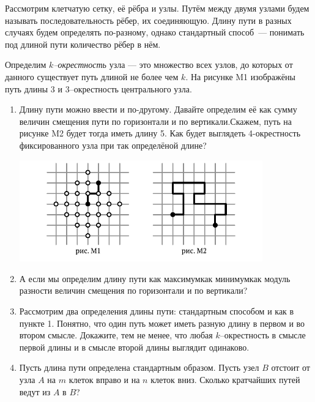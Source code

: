 ﻿

\noindent Рассмотрим клетчатую сетку, её рёбра и узлы. Путём между двумя узлами будем называть последовательность рёбер, их соединяющую. Длину пути в разных случаях будем определять по-разному, однако стандартный способ~— понимать под длиной пути количество рёбер в нём.

\ms Определим {\itshape $k$--окрестность} узла — это множество всех узлов, до которых от данного существует путь длиной не более чем $k$. На рисунке M1 изображёны путь длины 3 и 3--окрестность центрального узла.

\begin{enumerate}

\item Длину пути можно ввести и по-другому. Давайте определим её как сумму величин смещения пути по горизонтали и по вертикали.\linebreak Скажем, путь на рисунке M2 будет тогда иметь длину 5. Как будет выглядеть 4-окрестность фиксированного узла при так определёной длине?

\vspace{-0.3cm}
\begin{center}
\includegraphics[width=10.5cm]{stats/2017/images/metro1.pdf}
\end{center} \vspace{-0.7cm}

\item А если мы определим длину пути как максимум\scolon как минимум\scolon как модуль разности величин смещения по горизонтали и по вертикали?

\item Рассмотрим два определения длины пути: стандартным способом и как в пункте 1. Понятно, что один путь может иметь разную длину в первом и во втором смысле. Докажите, тем не менее, что любая $k$--окрестность в смысле первой длины и в смысле второй длины выглядит одинаково.

\item Пусть длина пути определена стандартным образом. Пусть узел $B$ отстоит от узла $A$ на $m$ клеток вправо и на $n$ клеток вниз. Сколько кратчайших путей ведут из $A$ в $B$?

\end{enumerate}

